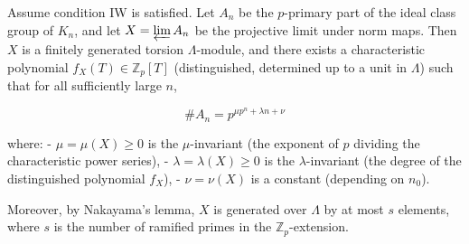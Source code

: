 Assume condition IW is satisfied. Let $A_n$ be the $p$-primary part of the ideal class group of $K_n$, and let $X = \varprojlim A_n$ be the projective limit under norm maps. Then $X$ is a finitely generated torsion $\Lambda$-module, and there exists a characteristic polynomial $f_X(T) \in \mathbb{Z}_p[T]$ (distinguished, determined up to a unit in $\Lambda$) such that for all sufficiently large $n$,

$$
\#A_n = p^{\mu p^n + \lambda n + \nu}
$$

where:
- $\mu = \mu(X) \geq 0$ is the $\mu$-invariant (the exponent of $p$ dividing the characteristic power series),
- $\lambda = \lambda(X) \geq 0$ is the $\lambda$-invariant (the degree of the distinguished polynomial $f_X$),
- $\nu = \nu(X)$ is a constant (depending on $n_0$).

Moreover, by Nakayama's lemma, $X$ is generated over $\Lambda$ by at most $s$ elements, where $s$ is the number of ramified primes in the $\mathbb{Z}_p$-extension.
